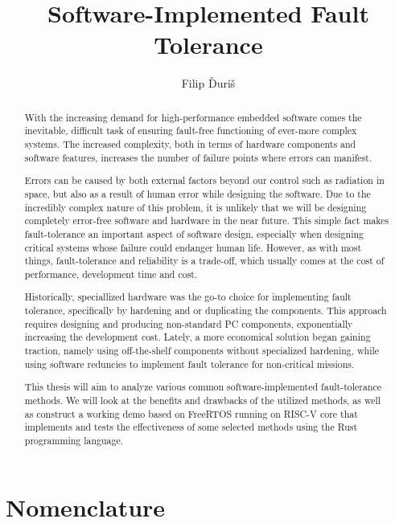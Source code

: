 \documentclass[12pt, letterpaper]{article}
\title{
    \Huge \textbf{Software-Implemented Fault Tolerance}
}
\author{Filip Ďuriš}
\begin{document}



\newpage

\begin{abstract}
With the increasing demand for high-performance embedded software comes the inevitable, difficult task of ensuring fault-free functioning of ever-more complex systems. The increased complexity, both in terms of hardware components and software features, increases the number of failure points where errors can manifest.

Errors can be caused by both external factors beyond our control such as radiation in space, but also as a result of human error while designing the software. Due to the incredibly complex nature of this problem, it is unlikely that we will be designing completely error-free software and hardware in the near future. This simple fact makes fault-tolerance an important aspect of software design, especially when designing critical systems whose failure could endanger human life. However, as with most things, fault-tolerance and reliability is a trade-off, which usually comes at the cost of performance, development time and cost.

Historically, speciallized hardware was the go-to choice for implementing fault tolerance, specifically by hardening and or duplicating the components. This approach requires designing and producing non-standard PC components, exponentially increasing the development cost. Lately, a more economical solution began gaining traction, namely using off-the-shelf components without specialized hardening, while using software reduncies to implement fault tolerance for non-critical missions.

This thesis will aim to analyze various common software-implemented fault-tolerance methods. We will look at the benefits and drawbacks of the utilized methods, as well as construct a working demo based on FreeRTOS running on RISC-V core that implements and tests the effectiveness of some selected methods using the Rust programming language.
\end{abstract}

\newpage

\tableofcontents

\newpage

\section{Nomenclature}
\end{document}
